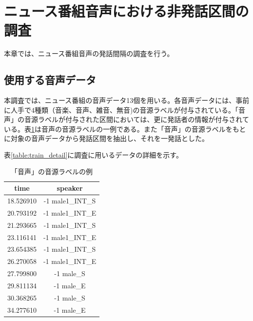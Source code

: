 \section{ニュース番組音声における非発話区間の調査}
本章では、ニュース番組音声の発話間隔の調査を行う。

\subsection{使用する音声データ}
\label{section:detail_train_news}
本調査では、ニュース番組の音声データ13個を用いる。各音声データには、事前に人手で4種類（音楽、音声、雑音、無音)の音源ラベルが付与されている。「音声」の音源ラベルが付与された区間においては、更に発話者の情報が付与されている。表\ref{fig:example_label}は音声の音源ラベルの一例である。また「音声」の音源ラベルをもとに対象の音声データから発話区間を抽出し、それを一発話とした。\par
表\ref{table:train_detail}に調査に用いるデータの詳細を示す。\vspace{0.2in}

\begin{table}[H]
\begin{center}
\caption{「音声」の音源ラベルの例 \label{fig:example_label}}
\begin{tabular}{|c|c|}
\hline
time      & speaker          \\ \hline
18.526910 & -1 male1\_INT\_S \\ \hline
20.793192 & -1 male1\_INT\_E \\ \hline
21.293665 & -1 male1\_INT\_S \\ \hline
23.116141 & -1 male1\_INT\_E \\ \hline
23.654385 & -1 male1\_INT\_S \\ \hline
26.270058 & -1 male1\_INT\_E \\ \hline
27.799800 & -1 male\_S       \\ \hline
29.811134 & -1 male\_E       \\ \hline
30.368265 & -1 male\_S       \\ \hline
34.277610 & -1 male\_E       \\ \hline
\end{tabular}
\end{center}
\end{table}


